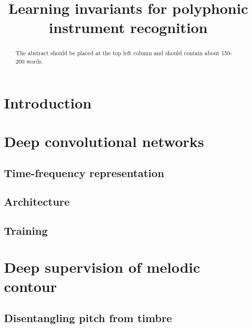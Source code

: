 \documentclass{article}
\title{Learning invariants for polyphonic instrument recognition}
\begin{document}
%
\maketitle
%
\begin{abstract}
The abstract should be placed at the top left column and should contain about 150-200 words.
\end{abstract}
%

\section{Introduction}\label{sec:introduction}


\section{Deep convolutional networks}
\subsection{Time-frequency representation}

\subsection{Architecture}

\subsection{Training}

\section{Deep supervision of melodic contour}
\subsection{Disentangling pitch from timbre}
\end{document}
